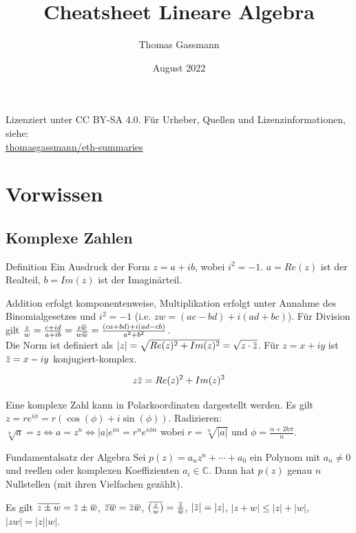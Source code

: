 \documentclass[a4paper,10pt]{article}
\title{Cheatsheet Lineare Algebra}
\author{Thomas Gassmann}
\date{August 2022}
\newcommand{\overbar}[1]{\mkern 1.5mu\overline{\mkern-1.5mu#1\mkern-1.5mu}\mkern 1.5mu}
\begin{document}
\begin{center}
  Lizenziert unter CC BY-SA 4.0. Für Urheber, Quellen und Lizenzinformationen, siehe:\\
  \href{https://github.com/thomasgassmann/eth-summaries}{thomasgassmann/eth-summaries}
\end{center}

\section{Vorwissen}
\subsection{Komplexe Zahlen}
\begin{mainbox}{Definition}
Ein Ausdruck der Form $z = a + ib$, wobei $i^2 = -1$. $a = Re(z)$ ist der Realteil, $b = Im(z)$ ist der Imaginärteil.
\end{mainbox}

Addition erfolgt komponentenweise, Multiplikation erfolgt unter Annahme des Binomialgesetzes und $i^2 = -1$ (i.e. $z w = (a c - b d) + i (a d + b  c)$). Für Division gilt $\frac{z}{w} = \frac{c + id}{a + ib} = \frac{z\overbar{w}}{w\overbar{w}} = \frac{(ca + bd) + i(ad - cb)}{a^2 + b^2}$.\\
Die Norm ist definiert als $|z| = \sqrt{Re(z)^2 + Im(z)^2} = \sqrt{z \cdot \overbar{z}}$. Für $z = x + iy$ ist $\overbar{z} = x - iy$ konjugiert-komplex.

\begin{subbox}{}
$$z \overbar{z} = Re(z)^2 + Im(z)^2$$
\end{subbox}

Eine komplexe Zahl kann in Polarkoordinaten dargestellt werden. Es gilt $z = re^{i\phi} = r(\cos(\phi) + i\sin(\phi))$.
Radizieren: $\sqrt[n]{a} = z \iff a = z^n \iff |a| e^{i\alpha} = r^n e^{i\phi n}$ wobei $r = \sqrt[n]{|a|}$ und $\phi = \frac{\alpha + 2k\pi}{n}$.

\begin{mainbox}{Fundamentalsatz der Algebra}
  Sei $p(z) = a_n z^n + \cdots + a_0$ ein Polynom mit $a_n \neq 0$ und reellen oder komplexen Koeffizienten $a_i \in \mathbb{C}$. Dann hat $p(z)$ genau $n$ Nullstellen (mit ihren Vielfachen gezählt).
\end{mainbox}

Es gilt $\overbar{z \pm w} = \overbar{z} \pm \overbar{w}$, $\overbar{zw} = \overbar{z}\overbar{w}$, $\overbar{(\frac{z}{w})} = \frac{\overbar{z}}{\overbar{w}}$, $|\overbar{z}| = |z|$, $|z + w| \leq |z| + |w|$, $|zw| = |z| |w|$.
\end{document}

